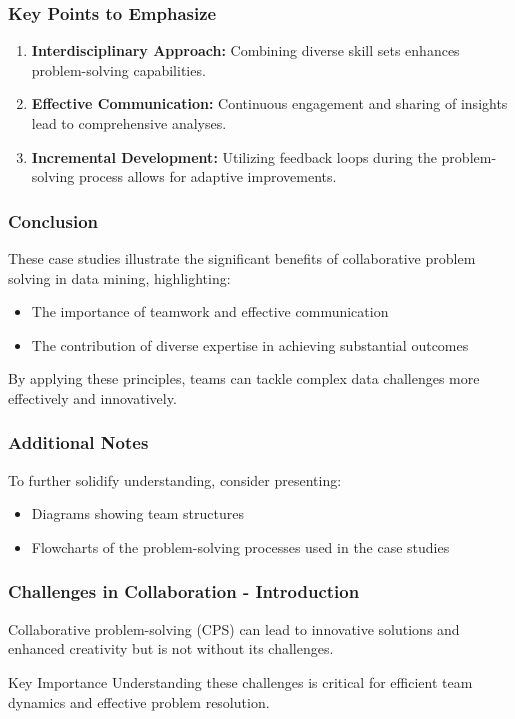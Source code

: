 \documentclass{beamer}
\begin{document}
\begin{frame}[fragile]
    \frametitle{Key Points to Emphasize}
    \begin{enumerate}
        \item \textbf{Interdisciplinary Approach:} Combining diverse skill sets enhances problem-solving capabilities.
        \item \textbf{Effective Communication:} Continuous engagement and sharing of insights lead to comprehensive analyses.
        \item \textbf{Incremental Development:} Utilizing feedback loops during the problem-solving process allows for adaptive improvements.
    \end{enumerate}
\end{frame}

\begin{frame}[fragile]
    \frametitle{Conclusion}
    These case studies illustrate the significant benefits of collaborative problem solving in data mining, highlighting:
    \begin{itemize}
        \item The importance of teamwork and effective communication
        \item The contribution of diverse expertise in achieving substantial outcomes
    \end{itemize}
    By applying these principles, teams can tackle complex data challenges more effectively and innovatively.
\end{frame}

\begin{frame}[fragile]
    \frametitle{Additional Notes}
    To further solidify understanding, consider presenting:
    \begin{itemize}
        \item Diagrams showing team structures
        \item Flowcharts of the problem-solving processes used in the case studies
    \end{itemize}
\end{frame}

\begin{frame}[fragile]
    \frametitle{Challenges in Collaboration - Introduction}
    Collaborative problem-solving (CPS) can lead to innovative solutions and enhanced creativity but is not without its challenges. 

    \begin{block}{Key Importance}
        Understanding these challenges is critical for efficient team dynamics and effective problem resolution.
    \end{block}
\end{frame}
\end{document}

